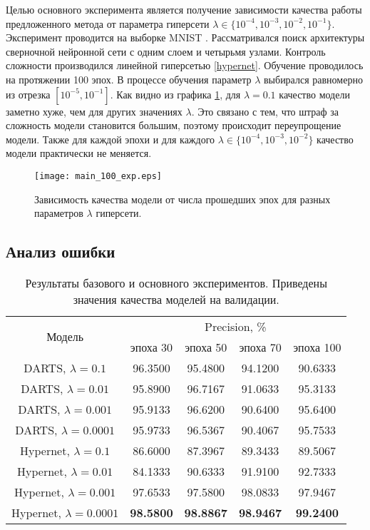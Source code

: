 \documentclass[12pt, twoside]{article}
\begin{document}
Целью основного эксперимента является получение зависимости качества работы предложенного метода от параметра гиперсети $\lambda \in \{10^{-4}, 10^{-3}, 10^{-2}, 10^{-1}\}$. Эксперимент проводится на выборке MNIST \cite{lecun-mnisthandwrittendigit-2010}. Рассматривался поиск архитектуры сверночной нейронной сети с одним слоем и четырьмя узлами. Контроль сложности производился линейной гиперсетью \ref{hypernet}. Обучение проводилось на протяжении 100 эпох. В процессе обучения параметр $\lambda$ выбирался равномерно из отрезка $[10^{-5}, 10^{-1}]$. Как видно из графика \ref{fig:main_exp}, для $\lambda = 0.1$ качество модели заметно хуже, чем для других значениях $\lambda$. Это связано с тем, что штраф за сложность модели становится большим, поэтому происходит переупрощение модели. Также для каждой эпохи и для каждого $\lambda \in \{10^{-4}, 10^{-3}, 10^{-2}\}$ качество модели практически не меняется.

\begin{figure}[H]
\centering
  \texttt{[image: main\_100\_exp.eps]}
  \caption{Зависимость качества модели от числа прошедших эпох для разных параметров $\lambda$ гиперсети.}
  \label{fig:main_exp}
\end{figure}

\subsection{Анализ ошибки}

\begin{table}[H]
\centering
	\begin{tabular}{ |c|c|c|c|c| }
	\hline
	 \multirow{2}{*}{Модель} & \multicolumn{4}{c|}{Precision, \%} \\ \cline{2-5}
	 		& эпоха 30 & эпоха 50 & эпоха 70 & эпоха 100\\
	 \hline
 	DARTS, $\lambda = 0.1$ &96.3500 & 95.4800 & 94.1200 & 90.6333  \\ 
 	DARTS, $\lambda = 0.01$ &95.8900 & 96.7167& 91.0633 & 95.3133 \\ 
 	DARTS, $\lambda = 0.001$ &95.9133 & 96.6200 & 90.6400 & 95.6400 \\ 
 	DARTS, $\lambda = 0.0001$ &95.9733 & 96.5367 & 90.4067 & 95.7533\\
 	\hline
 	Hypernet, $\lambda = 0.1$&86.6000 &87.3967 & 89.3433 & 89.5067 \\
 	Hypernet, $\lambda = 0.01$& 84.1333 & 90.6333 &91.9100 & 92.7333\\
 	Hypernet, $\lambda = 0.001$&97.6533 & 97.5800 & 98.0833 & 97.9467 \\
 	Hypernet, $\lambda = 0.0001$& \textbf{98.5800} &  \textbf{98.8867}&\textbf{98.9467}&\textbf{99.2400} \\
 	\hline
\end{tabular}
\caption{\label{tab:exp} Результаты базового и основного экспериментов. Приведены значения качества моделей на валидации.}
\end{table}
\end{document}
